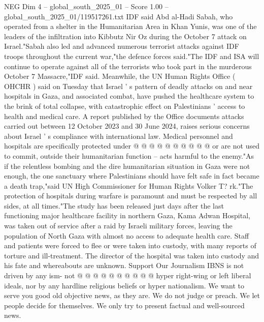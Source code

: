\begin{textsample}{NEG Dim 4 – global\_south\_2025\_01 – Score 1.00 – global\_south\_2025\_01/119517261.txt}  \label{ex:f4_neg_441}
IDF said Abd al-Hadi Sabah, who operated from a shelter in the Humanitarian Area in Khan Yunis, was one of the leaders of the infiltration into Kibbutz Nir Oz during the October 7 attack on Israel."Sabah also led and advanced numerous terrorist attacks against IDF troops throughout the current war,"the defence forces said."The IDF and ISA will continue to operate against all of the terrorists who took part in the murderous October 7 Massacre,"IDF said.
Meanwhile, the UN Human Rights Office ( OHCHR ) said on Tuesday that Israel ' s pattern of deadly attacks on and near hospitals in Gaza, and associated combat, have pushed the healthcare system to the brink of total collapse, with catastrophic effect on Palestinians ' access to health and medical care.
A report published by the Office documents attacks carried out between 12 October 2023 and 30 June 2024, raises serious concerns about Israel ' s compliance with international law.
Medical personnel and hospitals are specifically protected under @ @ @ @ @ @ @ @ @ @ or are not used to commit, outside their humanitarian function -- acts harmful to the enemy."As if the relentless bombing and the dire humanitarian situation in Gaza were not enough, the one sanctuary where Palestinians should have felt safe in fact became a death trap,"said UN High Commissioner for Human Rights Volker T? rk."The protection of hospitals during warfare is paramount and must be respected by all sides, at all times."The study has been released just days after the last functioning major healthcare facility in northern Gaza, Kama Adwan Hospital, was taken out of service after a raid by Israeli military forces, leaving the population of North Gaza with almost no access to adequate health care.
Staff and patients were forced to flee or were taken into custody, with many reports of torture and ill-treatment.
The director of the hospital was taken into custody and his fate and whereabouts are unknown.
Support Our Journalism IBNS is not driven by any ism- not @ @ @ @ @ @ @ @ @ @ hyper right-wing or left liberal ideals, nor by any hardline religious beliefs or hyper nationalism.
We want to serve you good old objective news, as they are.
We do not judge or preach.
We let people decide for themselves.
We only try to present factual and well-sourced news.

\end{textsample}
